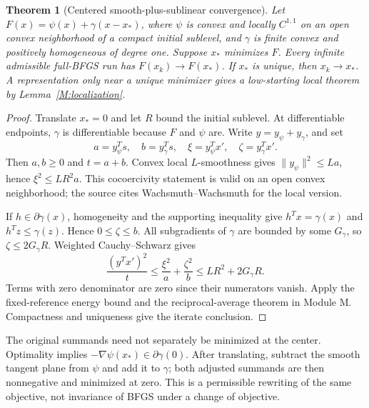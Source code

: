 \documentclass[10pt,oneside,openany]{book}
\newtheorem{theorem}{Theorem}[chapter]
\theoremstyle{remark}\newtheorem{remark}{Remark}[chapter]
\begin{document}
\begin{theorem}[Centered smooth-plus-sublinear convergence]\label{F:centered}
Let $F(x)=\psi(x)+\gamma(x-x_*)$, where $\psi$ is convex and locally $C^{1,1}$ on an open convex neighborhood of a compact initial sublevel, and $\gamma$ is finite convex and positively homogeneous of degree one. Suppose $x_*$ minimizes $F$. Every infinite admissible full-BFGS run has $F(x_k)\to F(x_*)$. If $x_*$ is unique, then $x_k\to x_*$. A representation only near a unique minimizer gives a low-starting local theorem by Lemma~\ref{M:localization}.
\end{theorem}
\begin{proof}
Translate $x_*=0$ and let $R$ bound the initial sublevel. At differentiable endpoints, $\gamma$ is differentiable because $F$ and $\psi$ are. Write $y=y_\psi+y_\gamma$, and set
\[
 a=y_\psi^Ts,\quad b=y_\gamma^Ts,\quad
 \xi=y_\psi^Tx',\quad\zeta=y_\gamma^Tx'.
\]
Then $a,b\ge0$ and $t=a+b$. Convex local $L$-smoothness gives $\|y_\psi\|^2\le La$, hence $\xi^2\le LR^2a$. This cocoercivity statement is valid on an open convex neighborhood; the source cites Wachsmuth--Wachsmuth for the local version.

If $h\in\partial\gamma(x)$, homogeneity and the supporting inequality give $h^Tx=\gamma(x)$ and $h^Tz\le\gamma(z)$. Hence $0\le\zeta\le b$. All subgradients of $\gamma$ are bounded by some $G_\gamma$, so $\zeta\le2G_\gamma R$. Weighted Cauchy--Schwarz gives
\[
 \frac{(y^Tx')^2}{t}
 \le\frac{\xi^2}{a}+\frac{\zeta^2}{b}
 \le LR^2+2G_\gamma R.
\]
Terms with zero denominator are zero since their numerators vanish. Apply the fixed-reference energy bound and the reciprocal-average theorem in Module M. Compactness and uniqueness give the iterate conclusion.
\end{proof}
The original summands need not separately be minimized at the center. Optimality implies $-\nabla\psi(x_*)\in\partial\gamma(0)$. After translating, subtract the smooth tangent plane from $\psi$ and add it to $\gamma$; both adjusted summands are then nonnegative and minimized at zero. This is a permissible rewriting of the same objective, not invariance of BFGS under a change of objective.
\end{document}
